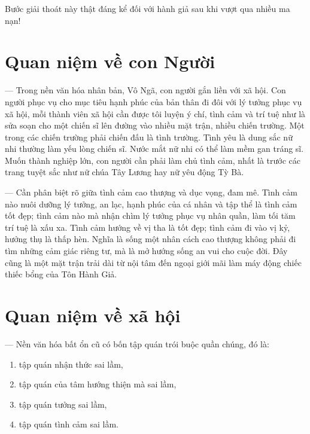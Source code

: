 Bước giải thoát này thật đáng kể đối với hành giả sau khi vượt qua nhiều ma nạn!

\section{Quan niệm về con Người} %
\label{sec:53_54_con_nguoi}

— Trong nền văn hóa nhân bản, Vô Ngã, con người gắn liền với xã hội. Con người phục vụ cho mục tiêu hạnh phúc của bản thân đi đôi với lý tưởng phục vụ xã hội, mỗi thành viên xã hội cần được tôi luyện ý chí, tình cảm và trí tuệ như là sửa soạn cho một chiến sĩ lên đường vào nhiều mặt trận, nhiều chiến trường. Một trong các chiến trường phải chiến đấu là tình trường. Tình yêu là dung sắc nữ nhi thường làm yếu lòng chiến sĩ. Nước mắt nữ nhi có thể làm mềm gan tráng sĩ. Muốn thành nghiệp lớn, con người cần phải làm chủ tình cảm, nhất là trước các trang tuyệt sắc như nữ chúa Tây Lương hay nữ yêu động Tỳ Bà.

— Cần phân biệt rõ giữa tình cảm cao thượng và dục vọng, đam mê. Tình cảm nào nuôi dưỡng lý tưởng, an lạc, hạnh phúc của cá nhân và tập thể là tình cảm tốt đẹp; tình cảm nào mà nhận chìm lý tưởng phục vụ nhân quần, làm tối tăm trí tuệ là xấu xa. Tình cảm hướng về vị tha là tốt đẹp; tình cảm đi vào vị kỷ, hưởng thụ là thấp hèn. Nghĩa là sống một nhân cách cao thượng không phải đi tìm những cảm giác riêng tư, mà là mở hướng sống an vui cho cuộc đời. Đây cũng là một mặt trận trải dài từ nội tâm đến ngoại giới mãi làm máy động chiếc thiếc bổng của Tôn Hành Giả.

\section{Quan niệm về xã hội} %
\label{sec:53_54_xa_hoi}

— Nền văn hóa bất ổn cũ có bốn tập quán trói buộc quần chúng, đó là:

\begin{enumerate}[label=\itshape\arabic*\upshape/]
    \item tập quán nhận thức sai lầm,

    \item tập quán của tâm hướng thiện mà sai lầm,

    \item tập quán tưởng sai lầm,

    \item tập quán tình cảm sai lầm.
\end{enumerate}

